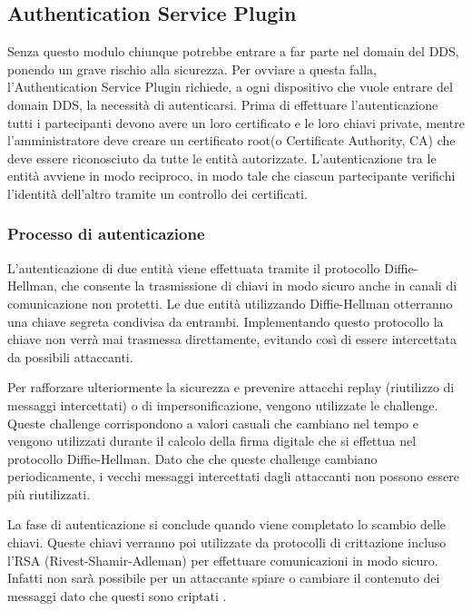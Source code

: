 \subsection{Authentication Service Plugin}
Senza questo modulo chiunque potrebbe entrare a far parte nel domain
del DDS, ponendo un grave rischio alla sicurezza. Per ovviare a questa
falla, l'Authentication Service Plugin richiede, a ogni dispositivo che 
vuole entrare del domain DDS, la necessità di autenticarsi.
Prima di effettuare l'autenticazione tutti i partecipanti devono 
avere un loro certificato e le loro chiavi private, mentre 
l'amministratore deve creare un certificato root(o Certificate Authority, CA) 
che deve essere riconosciuto da tutte le entità autorizzate. 
L'autenticazione tra le entità avviene in modo reciproco, 
in modo tale che ciascun partecipante verifichi l'identità dell'altro
tramite un controllo dei certificati.


\subsubsection{Processo di autenticazione}
L'autenticazione di due entità viene effettuata
tramite il protocollo Diffie-Hellman, che consente la trasmissione 
di chiavi in modo sicuro anche in canali di comunicazione non protetti.
Le due entità utilizzando Diffie-Hellman otterranno una chiave 
segreta condivisa da entrambi. Implementando questo 
protocollo la chiave non verrà mai 
trasmessa direttamente, evitando così di essere intercettata da 
possibili attaccanti. 

Per rafforzare ulteriormente la sicurezza e prevenire attacchi replay 
(riutilizzo di messaggi intercettati) o di impersonificazione, vengono 
utilizzate le challenge. Queste challenge corrispondono a valori 
casuali che cambiano nel tempo e vengono utilizzati durante il 
calcolo della firma digitale che si effettua nel protocollo
Diffie-Hellman.
Dato che che queste challenge cambiano periodicamente,
i vecchi messaggi intercettati dagli attaccanti non possono essere 
più riutilizzati.

La fase di autenticazione si conclude quando viene completato
lo scambio delle chiavi.
Queste chiavi verranno poi utilizzate da protocolli di 
crittazione incluso l'RSA (Rivest-Shamir-Adleman) per effettuare 
comunicazioni in modo sicuro. Infatti non sarà possibile per un 
attaccante spiare o cambiare il contenuto dei messaggi dato 
che questi sono criptati 
\cite{DBLP:conf/asiaccs/WangLG24}.
\label{Processo di autenticazione}

